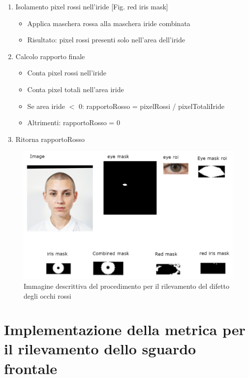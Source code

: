 \documentclass[12pt,a4paper,openright,twoside]{book}
\begin{document}
\begin{enumerate}
\begin{itemize}
\begin{itemize}
            \end{itemize}
    \end{itemize}
    \item Isolamento pixel rossi nell'iride [Fig. red iris mask] \begin{itemize}
        \item Applica maschera rossa alla maschera iride combinata
        \item Risultato: pixel rossi presenti solo nell'area dell'iride
    \end{itemize}
    \item Calcolo rapporto finale \begin{itemize}
        \item Conta pixel rossi nell'iride
        \item Conta pixel totali nell'area iride
        \item Se area iride $<$ 0: rapportoRosso = pixelRossi / pixelTotaliIride
        \item Altrimenti: rapportoRosso = 0
    \end{itemize}
    \item Ritorna rapportoRosso
\end{enumerate}
\begin{figure}
    \centering
    \includegraphics[width=1\linewidth]{figures/red-eye-process.png}
    \caption{Immagine descrittiva del procedimento per il rilevamento del difetto degli occhi rossi}
    \label{fig:red-eye-process}
\end{figure}

\chapter{Implementazione della metrica per il rilevamento dello sguardo frontale}
\end{document}
